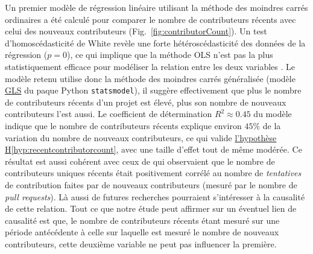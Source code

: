 \documentclass[dvipsnames,runningheads]{llncs}
\newcommand{\en}[1]{\foreignlanguage{english}{\emph{#1}}}
\begin{document}
    Un premier modèle de régression linéaire utilisant la méthode des moindres carrés ordinaires a été calculé
    pour comparer le nombre de contributeurs récents avec celui des nouveaux contributeurs
    (Fig.~\ref{fig:contributorCount}). Un test d'homoscédasticité de White revèle une forte hétéroscédasticité
    des données de la régression ($p = 0$), ce qui implique que la méthode OLS n'est pas la plus
    statistiquement efficace pour modéliser la relation entre les deux variables \parencite{GLS-2021}. Le
    modèle retenu utilise donc la méthode des moindres carrés généralisée (modèle
    \href{https://www.statsmodels.org/dev/generated/statsmodels.regression.linear_model.GLS.html}{GLS} du
    paque Python \texttt{statsmodel}), il suggère effectivement que plus le nombre de contributeurs récents
    d'un projet est élevé, plus son nombre de nouveaux contributeurs l'est aussi. Le coefficient de
    détermination $R^2 \approx 0.45$ du modèle indique que le nombre de contributeurs récents explique environ
    $45\%$ de la variation du nombre de nouveaux contributeurs, ce qui valide
    \hyperref[hyp:recentcontributorcount]{l'hypothèse H\ref*{hyp:recentcontributorcount}}, avec une taille
    d'effet tout de même modérée. Ce résultat est aussi cohérent avec ceux de
    \textcite[p.~12-13,16]{signals-2019} qui observaient que le nombre de contributeurs uniques récents était
    positivement corrélé au nombre de \emph{tentatives} de contribution faites par de nouveaux contributeurs
    (mesuré par le nombre de \en{pull requests}). Là aussi de futures recherches pourraient s'intéresser à la
    causalité de cette relation. Tout ce que notre étude peut affirmer sur un éventuel lien de causalité est
    que, le nombre de contributeurs récents étant mesuré sur une période antécédente à celle sur laquelle est
    mesuré le nombre de nouveaux contributeurs, cette deuxième variable ne peut pas influencer la première.
\end{document}

